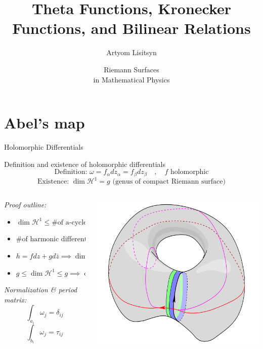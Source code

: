 \documentclass[11pt,aspectratio=169]{beamer}
\title{Theta Functions, Kronecker Functions, and Bilinear Relations}
\date[2023]{Riemann Surfaces \\ in Mathematical Physics}
\author{Artyom Lisitsyn}
\institute{D-PHYS}
\begin{document}
\def\titlefigure{elements/title-page-image}
\titleframe{}

\tocframe{}

\section{Abel's map}

\begin{frame}{Holomorphic Differentials}
    \begin{block}{Definition and existence of holomorphic differentials}
        \vspace{-1em}
        \[\text{Definition: } \omega = f_\alpha dz_\alpha = f_\beta dz_\beta \quad , \quad f \text{ holomorphic}\]
        \[\text{Existence: } \dim \mathcal H^1 = g \text{ (genus of compact Riemann surface)}\]
    \end{block}

    \begin{columns}[onlytextwidth]
        \begin{column}{0.55\textwidth}
            \emph{Proof outline:}
            \begin{itemize}
                \item $\dim \mathcal H^1 \leq \text{\# of a-cycles} = g$
                \item $\text{\# of harmonic differentials} = \dim H \geq 2g$
                \item $h = f dz + g d \bar z \implies \dim H = 2 \dim \mathcal H^1$
                \item $g \leq \dim \mathcal H^1 \leq g \implies \dim \mathcal H^1 = g$
            \end{itemize}
            \emph{Normalization \& period matrix:}
            \[ \int_{a_i} \omega_j = \delta_{ij} \]
            \[ \int_{b_i} \omega_j = \tau_{ij} \]
        \end{column}
        \begin{column}{0.45\textwidth}
            \center{}
            \includegraphics[width=0.8\columnwidth]{assets/HarmonicDifferential.png}
            

\end{column}
\end{columns}
\end{frame}
\end{document}
